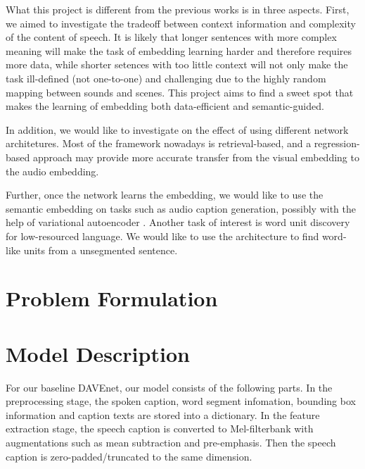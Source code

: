 \documentclass[a4paper]{article}
\begin{document}
What this project is different from the previous works is in three aspects. First, we aimed
to investigate the tradeoff between context
information and complexity of the content of
speech. It is likely that longer sentences
with more complex meaning will make the task of
embedding learning harder and therefore requires
more data, while shorter setences with too 
little context will not only make the task ill-defined (not one-to-one) and challenging
due to the highly random mapping between sounds
and scenes. This project aims to find a sweet
spot that makes the learning of embedding both data-efficient and semantic-guided.

In addition, we would like to investigate on
the effect of using different network 
architetures. Most of the framework nowadays is
retrieval-based, and a regression-based 
approach may provide more accurate transfer from the visual embedding to the audio embedding. 

Further, once the network learns the embedding,
we would like to use the semantic
embedding on tasks such as audio caption generation, possibly with the
help of variational autoencoder \cite{Kingma14}. Another task of interest is
 word unit discovery for low-resourced language. We would like to use the architecture
 to find word-like units from a unsegmented sentence. 



\section{Problem Formulation}
 
 
 

\section{Model Description}
For our baseline DAVEnet, our model consists of the following
parts.
In the preprocessing stage, the spoken caption,
word segment infomation, bounding box information and caption texts are stored into
a dictionary. 
In the feature extraction stage, the
speech caption is converted to Mel-filterbank
with augmentations such as mean subtraction
and pre-emphasis. Then the speech caption is
zero-padded/truncated to the same dimension.
\end{document}
